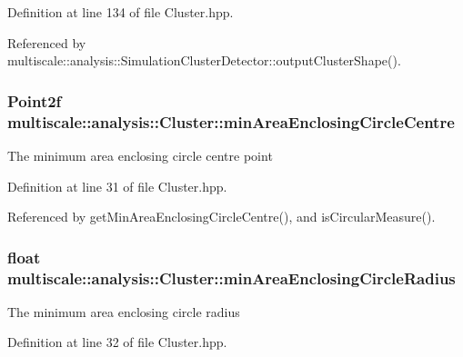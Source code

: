 Definition at line 134 of file Cluster.\-hpp.



Referenced by multiscale\-::analysis\-::\-Simulation\-Cluster\-Detector\-::output\-Cluster\-Shape().

\hypertarget{classmultiscale_1_1analysis_1_1Cluster_a47e672060b4025dcd07ebb9c5fd99f0c}{
\subsubsection[{min\-Area\-Enclosing\-Circle\-Centre}]{\setlength{\rightskip}{0pt plus 5cm}Point2f multiscale\-::analysis\-::\-Cluster\-::min\-Area\-Enclosing\-Circle\-Centre\hspace{0.3cm}{\ttfamily [private]}}}\label{classmultiscale_1_1analysis_1_1Cluster_a47e672060b4025dcd07ebb9c5fd99f0c}
The minimum area enclosing circle centre point 

Definition at line 31 of file Cluster.\-hpp.



Referenced by get\-Min\-Area\-Enclosing\-Circle\-Centre(), and is\-Circular\-Measure().

\hypertarget{classmultiscale_1_1analysis_1_1Cluster_a070994481884a4c7f5aa4879ce7b0568}{
\subsubsection[{min\-Area\-Enclosing\-Circle\-Radius}]{\setlength{\rightskip}{0pt plus 5cm}float multiscale\-::analysis\-::\-Cluster\-::min\-Area\-Enclosing\-Circle\-Radius\hspace{0.3cm}{\ttfamily [private]}}}\label{classmultiscale_1_1analysis_1_1Cluster_a070994481884a4c7f5aa4879ce7b0568}
The minimum area enclosing circle radius 

Definition at line 32 of file Cluster.\-hpp.



